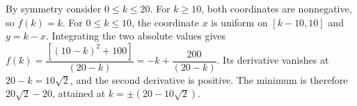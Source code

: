 By symmetry consider $0\le k\le20$. For $k\ge10$, both coordinates are nonnegative, so $f(k)=k$. For $0\le k\le10$, the coordinate $x$ is uniform on $[k-10,10]$ and $y=k-x$. Integrating the two absolute values gives $f(k)=\dfrac{[(10-k)^2+100]}{(20-k)}=-k+\dfrac{200}{(20-k)}$. Its derivative vanishes at $20-k=10\sqrt2$, and the second derivative is positive. The minimum is therefore $\boxed{20\sqrt2-20}$, attained at $k=\pm(20-10\sqrt2)$.
